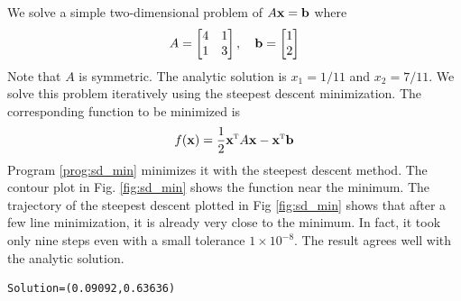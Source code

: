 \bigskip
\begin{example}\label{ex:sd_min}

We solve a simple two-dimensional problem of $A \vb{x} = \vb{b}$ where
\begin{equation}
A = \begin{bmatrix} 4 & 1\\ 1& 3 \end{bmatrix}, \quad \vb{b}=\begin{bmatrix} 1\\2\end{bmatrix}
\end{equation}
Note that $A$ is symmetric.
The analytic solution is $x_1=1/11$ and $x_2=7/11$.  
We solve this problem iteratively using the steepest descent minimization.
The corresponding function to be minimized is
\begin{equation}
f(\vb{x}) = \frac{1}{2} \vb{x}^\textsc{t} A \vb{x} - \vb{x}^\textsc{t} \vb{b}
\end{equation}
Program \ref{prog:sd_min} minimizes it with the steepest descent method.
The contour plot in Fig. \ref{fig:sd_min} shows the function near the minimum. The trajectory of the steepest descent plotted in Fig \ref{fig:sd_min} shows that after a few line minimization, it is already very close to the minimum.  In fact, it took only nine steps even with a small tolerance $1 \times 10^{-8}$.
The result agrees well with the analytic solution.

\begin{mybox}
\begin{verbatim}
Solution=(0.09092,0.63636)
\end{verbatim}
\end{mybox}


\end{example}
